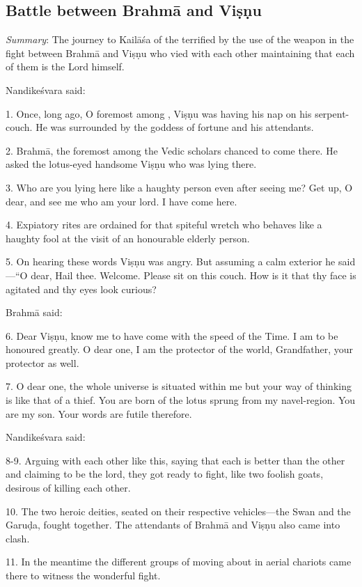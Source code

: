 \subsection{Battle between Brahmā and Viṣṇu}

\emph{Summary}: The journey to Kailāśa of the  terrified by the use of
the  weapon in the fight between Brahmā and Viṣṇu who vied with
each other maintaining that each of them is the Lord himself.

Nandikeśvara said:

1. Once, long ago, O foremost among , Viṣṇu was having his nap on his
serpent-couch. He was surrounded by the goddess of fortune and his attendants.

2. Brahmā, the foremost among the Vedic scholars chanced to come there. He asked
the lotus-eyed handsome Viṣṇu who was lying there.

3. Who are you lying here like a haughty person even after seeing me? Get up,
O dear, and see me who am your lord. I have come here.

4. Expiatory rites are ordained for that spiteful wretch who behaves like a
haughty fool at the visit of an honourable elderly person.

5. On hearing these words Viṣṇu was angry. But assuming a calm exterior he said
—“O dear, Hail thee. Welcome. Please sit on this couch. How is it that thy face
is agitated and thy eyes look curious?

Brahmā said:

6. Dear Viṣṇu, know me to have come with the speed of the Time. I am to be
honoured greatly. O dear one, I am the protector of the world, Grandfather,
your protector as well.

7. O dear one, the whole universe is situated within me but your way of thinking
is like that of a thief. You are born of the lotus sprung from my navel-region.
You are my son. Your words are futile therefore.

Nandikeśvara said:

8-9. Arguing with each other like this, saying that each is better than
the other and claiming to be the lord, they got ready to fight, like two foolish
goats, desirous of killing each other.

10. The two heroic deities, seated on their respective vehicles—the Swan and
the Garuḍa, fought together. The attendants of Brahmā and Viṣṇu also came into
clash.

11. In the meantime the different groups of  moving about in aerial
chariots came there to witness the wonderful fight.

